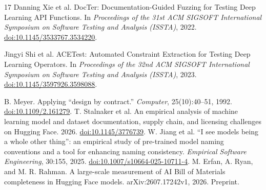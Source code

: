 \documentclass[10pt,twocolumn,letterpaper]{article}
\begin{document}
\begin{thebibliography}{17}
 Danning Xie et al. DocTer: Documentation-Guided Fuzzing for Testing Deep Learning API Functions. In \emph{Proceedings of the 31st ACM SIGSOFT International Symposium on Software Testing and Analysis (ISSTA)}, 2022. \href{https://doi.org/10.1145/3533767.3534220}{doi:10.1145/3533767.3534220}.

 Jingyi Shi et al. ACETest: Automated Constraint Extraction for Testing Deep Learning Operators. In \emph{Proceedings of the 32nd ACM SIGSOFT International Symposium on Software Testing and Analysis (ISSTA)}, 2023. \href{https://doi.org/10.1145/3597926.3598088}{doi:10.1145/3597926.3598088}.

 B. Meyer. Applying ``design by contract.'' \emph{Computer}, 25(10):40--51, 1992. \href{https://doi.org/10.1109/2.161279}{doi:10.1109/2.161279}.
 T. Stalnaker et al. An empirical analysis of machine learning model and dataset documentation, supply chain, and licensing challenges on Hugging Face. 2026. \href{https://doi.org/10.1145/3776739}{doi:10.1145/3776739}.
 W. Jiang et al. ``I see models being a whole other thing'': an empirical study of pre-trained model naming conventions and a tool for enhancing naming consistency. \emph{Empirical Software Engineering}, 30:155, 2025. \href{https://doi.org/10.1007/s10664-025-10711-4}{doi:10.1007/s10664-025-10711-4}.
 M. Erfan, A. Ryan, and M. R. Rahman. A large-scale measurement of AI Bill of Materials completeness in Hugging Face models. arXiv:2607.17242v1, 2026. Preprint.
\end{thebibliography}
\end{document}
